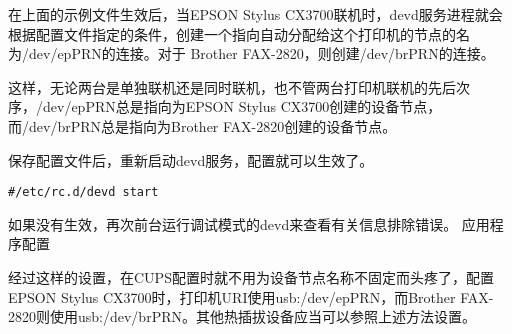 在上面的示例文件生效后，当EPSON Stylus CX3700联机时，devd服务进程就会根据配置文件指定的条件，创建一个指向自动分配给这个打印机的节点的名为/dev/epPRN的连接。对于 Brother FAX-2820，则创建/dev/brPRN的连接。

这样，无论两台是单独联机还是同时联机，也不管两台打印机联机的先后次序，/dev/epPRN总是指向为EPSON Stylus CX3700创建的设备节点，而/dev/brPRN总是指向为Brother FAX-2820创建的设备节点。

保存配置文件后，重新启动devd服务，配置就可以生效了。

\begin{verbatim}
#/etc/rc.d/devd start
\end{verbatim}

如果没有生效，再次前台运行调试模式的devd来查看有关信息排除错误。
应用程序配置

经过这样的设置，在CUPS配置时就不用为设备节点名称不固定而头疼了，配置EPSON Stylus CX3700时，打印机URI使用usb:/dev/epPRN，而Brother FAX-2820则使用usb:/dev/brPRN。其他热插拔设备应当可以参照上述方法设置。
